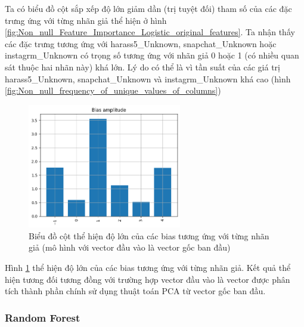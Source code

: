 \begin{enumerate}[label=(\alph*)]
    Ta có biểu đồ cột sắp xếp độ lớn giảm dần (trị tuyệt đối) tham số của các đặc trưng ứng với từng nhãn giả thể hiện ở hình \ref{fig:Non_null_Feature_Importance_Logistic_original_features}.
    Ta nhận thấy các đặc trưng tương ứng với harass5\_Unknown, snapchat\_Unknown hoặc instagrm\_Unknown có trọng số tương ứng với nhãn giả 0 hoặc 1 (có nhiều quan sát thuộc hai nhãn này) khá lớn.
    Lý do có thể là vì tần suất của các giá trị harass5\_Unknown, snapchat\_Unknown và instagrm\_Unknown khá cao (hình \ref{fig:Non_null_frequency_of_unique_values_of_columns})

    \begin{figure}[H]
        \centering
        \includegraphics[width=0.6\textwidth]{figures/Thanh/Data_Analysis/Non_null_Bias_Importance_Logistic_original_features.png}
        \caption{Biểu đồ cột thể hiện độ lớn của các bias tương ứng với từng nhãn giả (mô hình với vector đầu vào là vector gốc ban đầu)}
        \label{fig:Non_null_Bias_Importance_Logistic_original_features}
    \end{figure}

    Hình \ref{fig:Non_null_Bias_Importance_Logistic_original_features} thể hiện độ lớn của các bias tương ứng với từng nhãn giả.
    Kết quả thể hiện tương đối tương đồng với trường hợp vector đầu vào là vector được phân tích thành phần chính sử dụng thuật toán PCA từ vector gốc ban đầu.
\end{enumerate}

\subsubsection{Random Forest}

